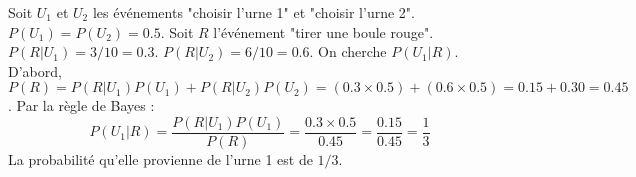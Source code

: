 \begin{correctionbox}
Soit $U_1$ et $U_2$ les événements "choisir l'urne 1" et "choisir l'urne 2". $P(U_1)=P(U_2)=0.5$.
Soit $R$ l'événement "tirer une boule rouge".
$P(R|U_1) = 3/10 = 0.3$.
$P(R|U_2) = 6/10 = 0.6$.
On cherche $P(U_1|R)$.
D'abord, $P(R) = P(R|U_1)P(U_1) + P(R|U_2)P(U_2) = (0.3 \times 0.5) + (0.6 \times 0.5) = 0.15 + 0.30 = 0.45$.
Par la règle de Bayes :
$$ P(U_1|R) = \frac{P(R|U_1)P(U_1)}{P(R)} = \frac{0.3 \times 0.5}{0.45} = \frac{0.15}{0.45} = \frac{1}{3} $$
La probabilité qu'elle provienne de l'urne 1 est de $1/3$.
\end{correctionbox}